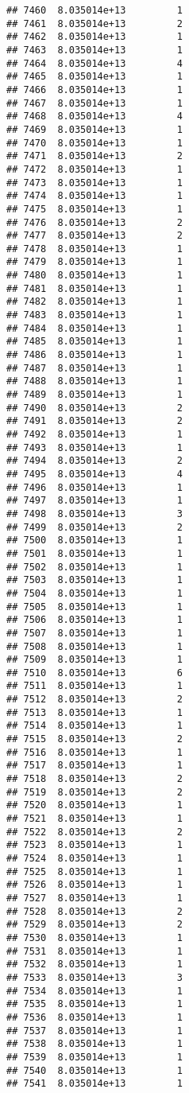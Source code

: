 \documentclass[
]{article}
\begin{document}
\begin{verbatim}
## 7460  8.035014e+13         1
## 7461  8.035014e+13         2
## 7462  8.035014e+13         1
## 7463  8.035014e+13         1
## 7464  8.035014e+13         4
## 7465  8.035014e+13         1
## 7466  8.035014e+13         1
## 7467  8.035014e+13         1
## 7468  8.035014e+13         4
## 7469  8.035014e+13         1
## 7470  8.035014e+13         1
## 7471  8.035014e+13         2
## 7472  8.035014e+13         1
## 7473  8.035014e+13         1
## 7474  8.035014e+13         1
## 7475  8.035014e+13         1
## 7476  8.035014e+13         2
## 7477  8.035014e+13         2
## 7478  8.035014e+13         1
## 7479  8.035014e+13         1
## 7480  8.035014e+13         1
## 7481  8.035014e+13         1
## 7482  8.035014e+13         1
## 7483  8.035014e+13         1
## 7484  8.035014e+13         1
## 7485  8.035014e+13         1
## 7486  8.035014e+13         1
## 7487  8.035014e+13         1
## 7488  8.035014e+13         1
## 7489  8.035014e+13         1
## 7490  8.035014e+13         2
## 7491  8.035014e+13         2
## 7492  8.035014e+13         1
## 7493  8.035014e+13         1
## 7494  8.035014e+13         2
## 7495  8.035014e+13         4
## 7496  8.035014e+13         1
## 7497  8.035014e+13         1
## 7498  8.035014e+13         3
## 7499  8.035014e+13         2
## 7500  8.035014e+13         1
## 7501  8.035014e+13         1
## 7502  8.035014e+13         1
## 7503  8.035014e+13         1
## 7504  8.035014e+13         1
## 7505  8.035014e+13         1
## 7506  8.035014e+13         1
## 7507  8.035014e+13         1
## 7508  8.035014e+13         1
## 7509  8.035014e+13         1
## 7510  8.035014e+13         6
## 7511  8.035014e+13         1
## 7512  8.035014e+13         2
## 7513  8.035014e+13         1
## 7514  8.035014e+13         1
## 7515  8.035014e+13         2
## 7516  8.035014e+13         1
## 7517  8.035014e+13         1
## 7518  8.035014e+13         2
## 7519  8.035014e+13         2
## 7520  8.035014e+13         1
## 7521  8.035014e+13         1
## 7522  8.035014e+13         2
## 7523  8.035014e+13         1
## 7524  8.035014e+13         1
## 7525  8.035014e+13         1
## 7526  8.035014e+13         1
## 7527  8.035014e+13         1
## 7528  8.035014e+13         2
## 7529  8.035014e+13         2
## 7530  8.035014e+13         1
## 7531  8.035014e+13         1
## 7532  8.035014e+13         1
## 7533  8.035014e+13         3
## 7534  8.035014e+13         1
## 7535  8.035014e+13         1
## 7536  8.035014e+13         1
## 7537  8.035014e+13         1
## 7538  8.035014e+13         1
## 7539  8.035014e+13         1
## 7540  8.035014e+13         1
## 7541  8.035014e+13         1

\end{verbatim}
\end{document}
